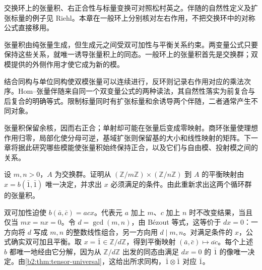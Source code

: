 \ProseParagraphBreak
交换环上的张量积、右正合性与标量变换可对照松村英之\cite[Appendix A, Tensor products, pp. 266--268; Appendix A, Change of coefficient ring, p. 268]{Matsumura1989CommutativeRingTheory}。伴随的自然性定义及扩张标量的例子见 Riehl\cite[Definition 4.1.1, pp. 116--117; Example 4.1.10(xi), p. 120]{Riehl2016CategoryTheory}。本章在一般环上分别核对左右作用，不把交换环中的对称公式直接移用。






\begin{chaptersummary}
	张量积由纯张量生成，但生成元之间受双可加性与平衡关系约束。两变量公式只要保持这些关系，就唯一诱导张量积上的同态。一般环上的张量积首先是交换群；双模提供的外侧作用才使它成为新的模。

	\ProseParagraphBreak
	结合同构与单位同构使双模张量可以连续进行，反环则记录右作用对应的乘法次序。Hom–张量伴随来自同一个双变量公式的两种读法，其自然性落实为前复合与后复合的明确等式。限制标量同时有扩张标量和余诱导两个伴随，二者通常产生不同对象。

	\ProseParagraphBreak
	张量积保留余核，因而右正合；单射却可能在张量后变成零映射。商环张量使理想作用归零，局部化使分母可逆，基域扩张则保留基的大小和线性映射的矩阵。下一章将据此研究哪些模能使张量积始终保持正合，以及它们与自由模、投射模之间的关系。
\end{chaptersummary}

\BookExercises

\begin{exercise}\label{b2:ex:06-balanced-cyclic}
	设 \(m,n>0\)，\(A\) 为交换群。证明从 \((\mathbb Z/m\mathbb Z)\times(\mathbb Z/n\mathbb Z)\) 到 \(A\) 的平衡映射由 \(x=b(\bar1,\bar1)\) 唯一决定，并求出 \(x\) 必须满足的条件。由此重新求出这两个循环群的张量积。
\end{exercise}
\begin{solution}
	双可加性迫使 \(b(\bar a,\bar c)=acx\)。代表元 \(a\) 加上 \(m\)、\(c\) 加上 \(n\) 时不改变结果，当且仅当 \(mx=nx=0\)。令 \(d=\gcd(m,n)\)，由 Bézout 等式，这等价于 \(dx=0\)：一方向将 \(d\) 写成 \(m,n\) 的整数线性组合，另一方向用 \(d\mid m,n\)。对满足条件的 \(x\)，公式确实双可加且平衡。取 \(x=\bar1\in\mathbb Z/d\mathbb Z\)，得到平衡映射 \((\bar a,\bar c)\mapsto\overline{ac}\)。每个上述 \(b\) 都唯一地经由它分解，因为从 \(\mathbb Z/d\mathbb Z\) 出发的同态由满足 \(dx=0\) 的 \(\bar1\) 的像唯一决定。由\cref{b2:thm:tensor-universal}，这给出所求同构，\(\bar1\otimes\bar1\) 对应 \(\bar1\)。
\end{solution}

